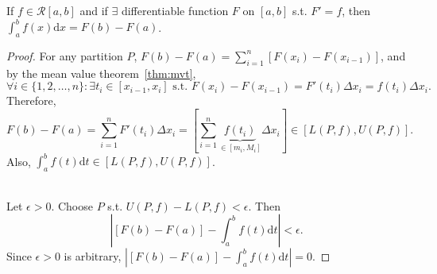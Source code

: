 \begin{thm}
	\label{thm:ftc}
	If $f \in \mathscr{R}[a,b]$ and if $\exists$ differentiable function $F$ on $[a,b]$ s.t. $F'=f$, then $\int_{a}^{b}{f(x)\mathrm{d}x}=F(b)-F(a)$.
	\begin{proof}
		For any partition $P$, $F(b)-F(a)=\sum_{i=1}^{n}{[F(x_{i})-F(x_{i-1})]}$, and by the mean value theorem~\ref{thm:mvt},
		\[
			\forall{i \in \{1,2,\ldots ,n\} }:\exists{t_i \in [x_{i-1},x_{i}]} \text{ s.t. } F(x_{i})-F(x_{i-1})=F'(t_i) \Delta x_i=f(t_i) \Delta x_i
			.\]
		Therefore,
		\[
			F(b)-F(a)=\sum_{i=1}^{n}{F'(t_i) \Delta x_i}=\left[\sum_{i=1}^{n}{\underbrace{f(t_i)}_{\in [m_i,M_i]} \Delta x_i}\right] \in [L(P,f),U(P,f)]
			.\]
		Also, $\int_{a}^{b}{f(t)\mathrm{d}t} \in [L(P,f),U(P,f)]$.\\
		\\
		Let $\epsilon>0$. Choose $P$ s.t. $U(P,f)-L(P,f)<\epsilon$. Then
		\[
			\left|[F(b)-F(a)]-\int_{a}^{b}{f(t)\mathrm{d}t}\right|<\epsilon
			.\]
		Since $\epsilon>0$ is arbitrary, $\left|[F(b)-F(a)]-\int_{a}^{b}{f(t)\mathrm{d}t}\right|=0$.
	\end{proof}
\end{thm}

